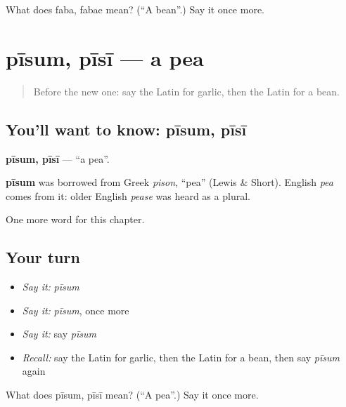 \begin{tcolorbox}[breakable,colback=teal!4,colframe=teal!35!black,title={Before you move on}]
What does faba, fabae mean? (\textquotedblleft{}A bean\textquotedblright{}.) Say it once more.
\end{tcolorbox}
\section[pīsum, pīsī]{pīsum, pīsī — a pea}

\label{lesson:LA-C127-pisum}



\begin{quote}
Before the new one: say the Latin for garlic, then the Latin for a bean.
\end{quote}

\subsection*{You'll want to know: pīsum, pīsī}
\textbf{pīsum, pīsī} — \textquotedblleft{}a pea\textquotedblright{}.

\begin{cousinweb}
\textbf{pīsum} was borrowed from Greek \emph{pison}, \textquotedblleft{}pea\textquotedblright{} (Lewis \& Short). English \emph{pea} comes from it: older English \emph{pease} was heard as a plural.
\end{cousinweb}

\begin{grammarlens}[title={What you've built}]
One more word for this chapter.
\end{grammarlens}

\subsection*{Your turn}
\begin{itemize}
\raggedright
  \item \emph{Say it:} \emph{pīsum}
  \item \emph{Say it:} \emph{pīsum}, once more
  \item \emph{Say it:} say \emph{pīsum}
  \item \emph{Recall:} say the Latin for garlic, then the Latin for a bean, then say \emph{pīsum} again
\end{itemize}

\begin{tcolorbox}[breakable,colback=teal!4,colframe=teal!35!black,title={Before you move on}]
What does pīsum, pīsī mean? (\textquotedblleft{}A pea\textquotedblright{}.) Say it once more.
\end{tcolorbox}
